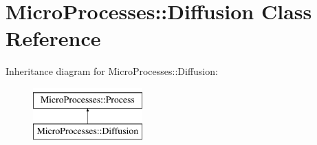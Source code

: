 \hypertarget{classMicroProcesses_1_1Diffusion}{}\section{Micro\+Processes\+:\+:Diffusion Class Reference}
\label{classMicroProcesses_1_1Diffusion}
Inheritance diagram for Micro\+Processes\+:\+:Diffusion\+:\begin{figure}[H]
\begin{center}
\leavevmode
\includegraphics[height=2.000000cm]{classMicroProcesses_1_1Diffusion}
\end{center}
\end{figure}
